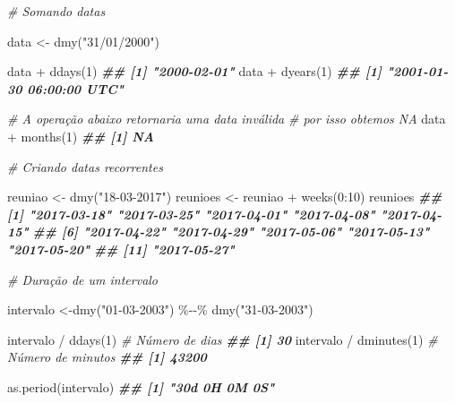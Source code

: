 \documentclass[
]{book}
\newenvironment{Shaded}{\begin{snugshade}}{\end{snugshade}}
\newcommand{\CommentTok}[1]{\textcolor[rgb]{0.56,0.35,0.01}{\textit{#1}}}
\newcommand{\DecValTok}[1]{\textcolor[rgb]{0.00,0.00,0.81}{#1}}
\newcommand{\DocumentationTok}[1]{\textcolor[rgb]{0.56,0.35,0.01}{\textbf{\textit{#1}}}}
\newcommand{\FunctionTok}[1]{\textcolor[rgb]{0.00,0.00,0.00}{#1}}
\newcommand{\NormalTok}[1]{#1}
\newcommand{\OtherTok}[1]{\textcolor[rgb]{0.56,0.35,0.01}{#1}}
\newcommand{\SpecialCharTok}[1]{\textcolor[rgb]{0.00,0.00,0.00}{#1}}
\newcommand{\StringTok}[1]{\textcolor[rgb]{0.31,0.60,0.02}{#1}}
\begin{document}
\begin{Shaded}
\begin{Highlighting}[]
\CommentTok{\# Somando datas}

\NormalTok{data }\OtherTok{\textless{}{-}} \FunctionTok{dmy}\NormalTok{(}\StringTok{"31/01/2000"}\NormalTok{)}

\NormalTok{data }\SpecialCharTok{+} \FunctionTok{ddays}\NormalTok{(}\DecValTok{1}\NormalTok{)}
\DocumentationTok{\#\# [1] "2000{-}02{-}01"}
\NormalTok{data }\SpecialCharTok{+} \FunctionTok{dyears}\NormalTok{(}\DecValTok{1}\NormalTok{)}
\DocumentationTok{\#\# [1] "2001{-}01{-}30 06:00:00 UTC"}

\CommentTok{\# A operação abaixo retornaria uma data inválida}
\CommentTok{\# por isso obtemos NA}
\NormalTok{data }\SpecialCharTok{+} \FunctionTok{months}\NormalTok{(}\DecValTok{1}\NormalTok{)  }
\DocumentationTok{\#\# [1] NA}

\CommentTok{\# Criando datas recorrentes}

\NormalTok{reuniao }\OtherTok{\textless{}{-}} \FunctionTok{dmy}\NormalTok{(}\StringTok{"18{-}03{-}2017"}\NormalTok{)}
\NormalTok{reunioes }\OtherTok{\textless{}{-}}\NormalTok{ reuniao }\SpecialCharTok{+} \FunctionTok{weeks}\NormalTok{(}\DecValTok{0}\SpecialCharTok{:}\DecValTok{10}\NormalTok{)}
\NormalTok{reunioes}
\DocumentationTok{\#\#  [1] "2017{-}03{-}18" "2017{-}03{-}25" "2017{-}04{-}01" "2017{-}04{-}08" "2017{-}04{-}15"}
\DocumentationTok{\#\#  [6] "2017{-}04{-}22" "2017{-}04{-}29" "2017{-}05{-}06" "2017{-}05{-}13" "2017{-}05{-}20"}
\DocumentationTok{\#\# [11] "2017{-}05{-}27"}

\CommentTok{\# Duração de um intervalo }

\NormalTok{intervalo }\OtherTok{\textless{}{-}}\FunctionTok{dmy}\NormalTok{(}\StringTok{"01{-}03{-}2003"}\NormalTok{) }\SpecialCharTok{\%{-}{-}\%} \FunctionTok{dmy}\NormalTok{(}\StringTok{"31{-}03{-}2003"}\NormalTok{) }

\NormalTok{intervalo }\SpecialCharTok{/} \FunctionTok{ddays}\NormalTok{(}\DecValTok{1}\NormalTok{)               }\CommentTok{\# Número de dias}
\DocumentationTok{\#\# [1] 30}
\NormalTok{intervalo }\SpecialCharTok{/} \FunctionTok{dminutes}\NormalTok{(}\DecValTok{1}\NormalTok{)            }\CommentTok{\# Número de minutos}
\DocumentationTok{\#\# [1] 43200}

\FunctionTok{as.period}\NormalTok{(intervalo)}
\DocumentationTok{\#\# [1] "30d 0H 0M 0S"}
\end{Highlighting}
\end{Shaded}
\end{document}
